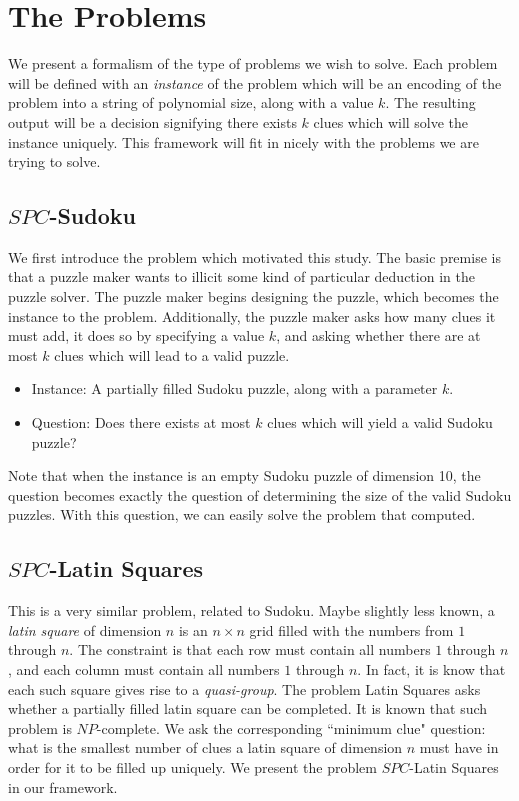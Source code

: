 \documentclass[runningheads,a4paper]{llncs}
\begin{document}
\section{The Problems}
\label{sec:The Problems}

We present a formalism of the type of problems we wish to solve. Each problem will be defined with an \emph{instance} of the problem which will be an encoding of the problem into a string of polynomial size, along with a value $k$. The resulting output will be a decision signifying there exists $k$ clues which will solve the instance uniquely. This framework will fit in nicely with the problems we are trying to solve.

\subsection{$SPC$-Sudoku}

We first introduce the problem which motivated this study. The basic premise is that a puzzle maker wants to illicit some kind of particular deduction in the puzzle solver. The puzzle maker begins designing the puzzle, which becomes the instance to the problem. Additionally, the puzzle maker asks how many clues it must add, it does so by specifying a value $k$, and asking whether there are at most $k$ clues which will lead to a valid puzzle.

\begin{itemize}
\item Instance: A partially filled Sudoku puzzle, along with a parameter $k$.
\item Question: Does there exists at most $k$ clues which will yield a valid Sudoku puzzle?
\end{itemize}

Note that when the instance is an empty Sudoku puzzle of dimension 10, the question becomes exactly the question of determining the size of the valid Sudoku puzzles. With this question, we can easily solve the problem that \cite{mcguire2012there} computed. 

\subsection{$SPC$-Latin Squares}

This is a very similar problem, related to Sudoku. Maybe slightly less known, a \emph{latin square} of dimension $n$ is an $n \times n$ grid filled with the numbers from $1$ through $n$. The constraint is that each row must contain all numbers $1$ through $n$, and each column must contain all numbers $1$ through $n$. In fact, it is know that each such square gives rise to a \emph{quasi-group}. The problem Latin Squares asks whether a partially filled latin square can be completed. It is known that such problem is $NP$-complete. We ask the corresponding ``minimum clue" question: what is the smallest number of clues a latin square of dimension $n$ must have in order for it to be filled up uniquely. We present the problem $SPC$-Latin Squares in our framework.
\end{document}
